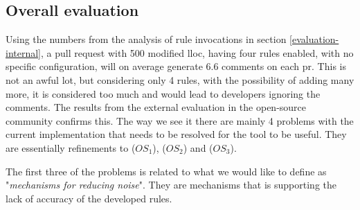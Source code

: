 \documentclass[pdftex,10pt,b5paper,twoside]{report}
\begin{document}

\subsection{Overall evaluation}
\label{evaluation-overall}

Using the numbers from the analysis of rule invocations in section \ref{evaluation-internal}, a pull request with 500 modified \gls{lloc}, having four rules enabled, with no specific configuration, will on average generate 6.6 comments on each \gls{pr}. This is not an awful lot, but considering only 4 rules, with the possibility of adding many more, it is considered too much and would lead to developers ignoring the comments. The results from the external evaluation in the open-source community confirms this. The way we see it there are mainly 4 problems with the current implementation that needs to be resolved for the tool to be useful. They are essentially refinements to (\(OS_{1}\)), (\(OS_{2}\)) and (\(OS_{3}\)). 

The first three of the problems is related to what we would like to define as "\textit{mechanisms for reducing noise}". They are mechanisms that is supporting the lack of accuracy of the developed rules.
\end{document}
